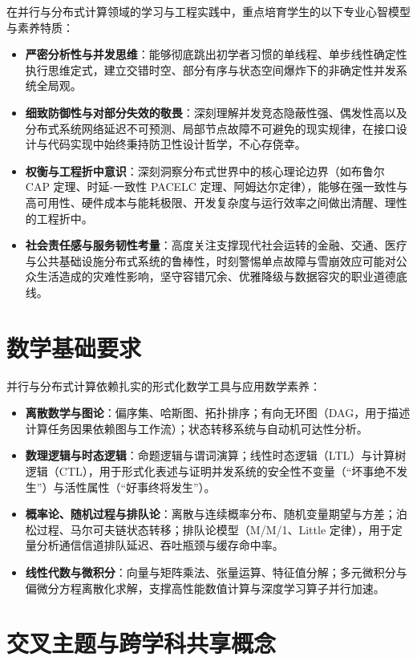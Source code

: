 在并行与分布式计算领域的学习与工程实践中，重点培育学生的以下专业心智模型与素养特质：
\begin{itemize}
    \item \textbf{严密分析性与并发思维}：能够彻底跳出初学者习惯的单线程、单步线性确定性执行思维定式，建立交错时空、部分有序与状态空间爆炸下的非确定性并发系统全局观。
    \item \textbf{细致防御性与对部分失效的敬畏}：深刻理解并发竞态隐蔽性强、偶发性高以及分布式系统网络延迟不可预测、局部节点故障不可避免的现实规律，在接口设计与代码实现中始终秉持防卫性设计哲学，不心存侥幸。
    \item \textbf{权衡与工程折中意识}：深刻洞察分布式世界中的核心理论边界（如布鲁尔 CAP 定理、时延-一致性 PACELC 定理、阿姆达尔定律），能够在强一致性与高可用性、硬件成本与能耗极限、开发复杂度与运行效率之间做出清醒、理性的工程折中。
    \item \textbf{社会责任感与服务韧性考量}：高度关注支撑现代社会运转的金融、交通、医疗与公共基础设施分布式系统的鲁棒性，时刻警惕单点故障与雪崩效应可能对公众生活造成的灾难性影响，坚守容错冗余、优雅降级与数据容灾的职业道德底线。
\end{itemize}

\section{数学基础要求}

并行与分布式计算依赖扎实的形式化数学工具与应用数学素养：
\begin{itemize}
    \item \textbf{离散数学与图论}：偏序集、哈斯图、拓扑排序；有向无环图（DAG，用于描述计算任务因果依赖图与工作流）；状态转移系统与自动机可达性分析。
    \item \textbf{数理逻辑与时态逻辑}：命题逻辑与谓词演算；线性时态逻辑（LTL）与计算树逻辑（CTL），用于形式化表述与证明并发系统的安全性不变量（“坏事绝不发生”）与活性属性（“好事终将发生”）。
    \item \textbf{概率论、随机过程与排队论}：离散与连续概率分布、随机变量期望与方差；泊松过程、马尔可夫链状态转移；排队论模型（M/M/1、Little 定律），用于定量分析通信信道排队延迟、吞吐瓶颈与缓存命中率。
    \item \textbf{线性代数与微积分}：向量与矩阵乘法、张量运算、特征值分解；多元微积分与偏微分方程离散化求解，支撑高性能数值计算与深度学习算子并行加速。
\end{itemize}

\section{交叉主题与跨学科共享概念}

